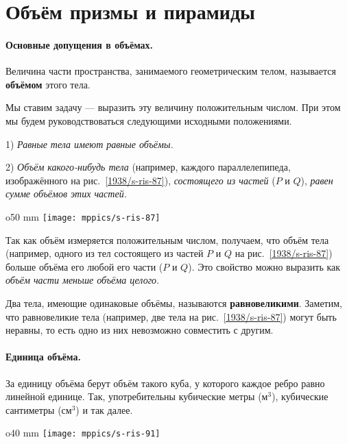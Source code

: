 \section{Объём призмы и пирамиды}

\paragraph{Основные допущения в объёмах.}\label{1938/s82}
Величина части пространства, занимаемого геометрическим телом, называется \textbf{объёмом} этого тела.

Мы ставим задачу — выразить эту величину положительным числом.
При этом мы будем руководствоваться следующими исходными положениями.

1) \emph{Равные тела имеют равные объёмы.}

2) \emph{Объём какого-нибудь тела}
(например, каждого параллелепипеда, изображённого на рис.~\ref{1938/s-ris-87}),
\emph{состоящего из частей}
($P$ и $Q$),
\emph{равен сумме объёмов этих частей.}

\begin{wrapfigure}{o}{50 mm}
\vskip-0mm
\centering
\texttt{[image: mppics/s-ris-87]}
\caption{}\label{1938/s-ris-87}
\vskip-0mm
\end{wrapfigure}

Так как объём измеряется положительным числом, получаем, что 
объём тела (например, одного из тел состоящего из частей $P$ и $Q$ на рис.~\ref{1938/s-ris-87})
больше объёма его любой его части ($P$ и $Q$).
Это свойство можно выразить как \emph{объём части меньше объёма целого}.

Два тела, имеющие одинаковые объёмы, называются \textbf{равновеликими}.
Заметим, что равновеликие тела (например, две тела на рис.~\ref{1938/s-ris-87}) могут быть неравны, то есть одно из них невозможно совместить с другим.

\paragraph{Единица объёма.}\label{1938/s83}
За единицу объёма берут объём такого куба, у которого каждое ребро равно линейной единице.
Так, употребительны кубические метры (м$^3$), кубические сантиметры (см$^3$) и так далее.

\begin{wrapfigure}{o}{40 mm}
\vskip-0mm
\centering
\texttt{[image: mppics/s-ris-91]}
\caption{}\label{1938/s-ris-91}
\vskip-0mm
\end{wrapfigure}

